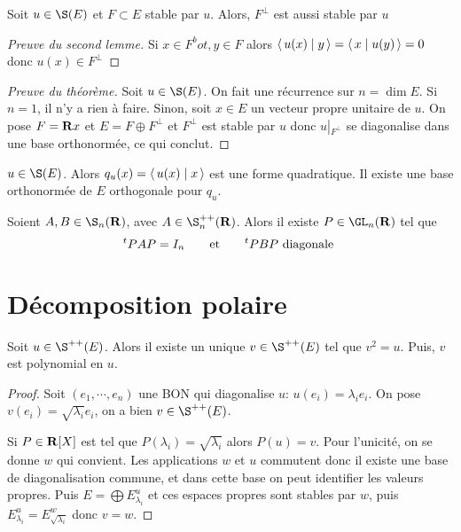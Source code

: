 \begin{lmm}
    Soit $u \in  \S(E)$ et $F\subset E$ stable par  $u$. Alors,  $F^\bot$ est aussi stable par  $u$
\end{lmm}

\begin{proof}[Preuve du second lemme]
    Si $x \in  F^bot, y \in  F$ alors $ \scalar{u(x)}{y}= \scalar{x}{u(y)}=0  $ donc $u(x)\in F^\bot$
\end{proof}

\begin{proof}[Preuve du théorème]
    Soit $u \in  \S(E)$. On fait une récurrence sur $n=\dim E$. Si  $n=1$, il n'y a rien à faire. Sinon, soit  $x\in  E$ un vecteur propre unitaire de $u$. On pose $F=\mathbf R x$ et $E=F\oplus F^\bot$ et  $F^\bot$ est stable par  $u$ donc  $u\left|_{F^\bot}\right.$ se diagonalise dans une base orthonormée, ce qui conclut.
\end{proof}


\begin{cor}
    $u \in  \S(E)$. Alors $q_u(x)= \scalar{u(x)}{x} $ est une forme quadratique. Il existe une base orthonormée de $E$ orthogonale pour $q_u$.
\end{cor}

\begin{cor}
    Soient $A, B \in  \S_n(\R)$, avec $A \in  \S_n^{++}(\R)$. Alors il existe $P \in  \GL_n(\R)$ tel que \[
        {}^t PAP=I_n \qquad \text{et}\qquad  {}^t PBP\text{ diagonale }
    \]
\end{cor}


\section{Décomposition polaire}

\begin{prop}
    Soit $u \in  \S^{++}(E)$. Alors il existe un unique $v \in  \S ^{++}(E)$ tel que $v^2 =u$. Puis, $v$ est polynomial en  $u$.
\end{prop}

\begin{proof}
    Soit $(e_1, \cdots , e_n)$ une BON qui diagonalise $u$:  $ u(e_i)=\lambda_i e_i$. On pose $v(e_i)=\sqrt{\lambda_i}e_i$, on a bien  $v \in  \S ^{++}(E)$.

    Si $P \in  \mathbf R[X]$ est tel que $P(\lambda_i)=\sqrt{\lambda_i}$ alors  $P(u)=v$. Pour l'unicité, on se donne  $w$ qui convient. Les applications  $w$ et  $u$ commutent donc il existe une base de diagonalisation commune, et dans cette base on peut identifier les valeurs propres. Puis  $E=\bigoplus E_{\lambda_i}^u$ et  ces espaces propres sont stables par  $w$, puis  $E_{\lambda_i}^u=E_{\sqrt{\lambda_i}}^w$ donc  $v=w$.
\end{proof}

